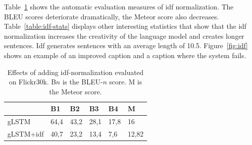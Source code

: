 \documentclass[twoside,twocolumn]{article}
\begin{document}
Table~\ref{table:results_idf} shows the automatic evaluation measures of idf normalization. The BLEU scores deteriorate dramatically, the Meteor score also decreases. Table~\ref{table:idf-stats} displays other interesting statistics that show that the idf normalization increases the creativity of the language model and creates longer sentences. Idf generates sentences with an average length of 10.5. Figure~\ref{fig:idf} shows an example of an improved caption and a caption where the system fails.

\begin{table}
    \centering
    \begin{tabular}{llllll}
        ~                  & B1 & B2 & B3 & B4 & M \\ \hline
        gLSTM        & 64,4   & 43,2            & 28,1   & 17,8   & 16 \\
        gLSTM+idf   & 40,7   & 23,2   & 13,4   & 7,6 & 12,82 \\ \hline
        
    \end{tabular}
    
    \caption{Effects of adding idf-normalization evaluated on Flickr30k. B$n$ is the BLEU-$n$ score. M is the Meteor score.}
    \label{table:results_idf}
\end{table}
\end{document}
